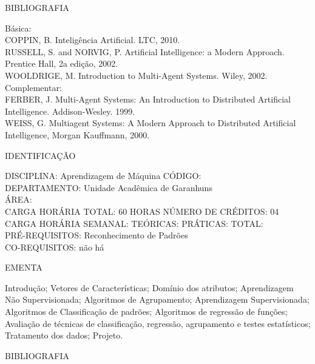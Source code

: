 \documentclass[
	12pt,				%
	openright,			%
  oneside,     %
	a4paper,			%
	chapter=TITLE,		%
	english,			%
	french,				%
	spanish,			%
	brazil				%
	]{abntex2}
\begin{document}
\begin{apendicesenv}
BIBLIOGRAFIA 

Básica:\\
COPPIN, B. Inteligência Artificial. LTC, 2010.\\
RUSSELL, S. and NORVIG, P. Artificial Intelligence: a Modern Approach.
Prentice Hall, 2a edição, 2002.\\
WOOLDRIGE, M. Introduction to Multi-Agent Systems. Wiley, 2002.\\
Complementar:\\
FERBER, J. Multi-Agent Systems: An Introduction to Distributed
Artificial Intelligence. Addison-Wesley. 1999.\\
WEISS, G. Multiagent Systems: A Modern Approach to Distributed
Artificial Intelligence, Morgan Kauffmann, 2000.

\newpage IDENTIFICAÇÃO

DISCIPLINA: Aprendizagem de Máquina CÓDIGO:\\ 
DEPARTAMENTO: Unidade Acadêmica de Garanhuns\\
ÁREA: \\
CARGA HORÁRIA TOTAL: 60 HORAS NÚMERO DE CRÉDITOS: 04\\
CARGA HORÁRIA SEMANAL: TEÓRICAS: PRÁTICAS: TOTAL: \\
PRÉ-REQUISITOS: Reconhecimento de Padrões\\
CO-REQUISITOS: não há

EMENTA 

Introdução; Vetores de Características; Domínio dos atributos;
Aprendizagem Não Supervisionada; Algoritmos de Agrupamento;
Aprendizagem Supervisionada; Algoritmos de Classificação de padrões;
Algoritmos de regressão de funções; Avaliação de técnicas de
classificação, regressão, agrupamento e testes estatísticos; Tratamento
dos dados; Projeto.

BIBLIOGRAFIA 


\end{apendicesenv}
\end{document}
